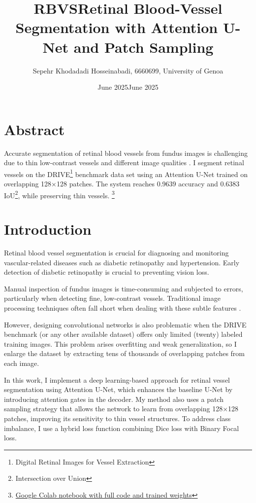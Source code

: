 \documentclass[11pt]{article}
\title{RBVS}
\author{Sepehr Khodadadi Hosseinabadi, 6660699, University of Genoa}
\date{June 2025}
\begin{document}
\title{\textbf{Retinal Blood-Vessel Segmentation with Attention U-Net and Patch Sampling}}  
\date{June 2025}
\maketitle

\section{Abstract}
\label{sec:Abstract}
Accurate segmentation of retinal blood vessels from fundus images is challenging due to thin low-contrast vessels and different image qualities \cite{memari2019retinal}. I segment retinal vessels on the DRIVE\footnote{Digital Retinal Images for Vessel Extraction} benchmark data set using an Attention U-Net trained on overlapping 128×128 patches. The system reaches 0.9639 accuracy and 0.6383 IoU\footnote{Intersection over Union}, while preserving thin vessels. \footnote{\href{https://colab.research.google.com/drive/1DBvdWY8Vw_HIo0jMHd9fOHY-Cog2nbwD?usp=sharing}{Google Colab notebook with full code and trained weights}}


\section{Introduction}
\label{sec:Introduction}

Retinal blood vessel segmentation is crucial for diagnosing and monitoring vascular-related diseases such as diabetic retinopathy and hypertension. Early detection of diabetic retinopathy is crucial to preventing vision loss.

Manual inspection of fundus images is time-consuming and subjected to errors, particularly when detecting fine, low-contrast vessels. Traditional image processing techniques often fall short when dealing with these subtle features \cite{memari2019retinal}.

However, designing convolutional networks is also problematic when the DRIVE benchmark (or any other available dataset) offers only limited (twenty) labeled training images. This problem arises overfitting and weak generalization, so I enlarge the dataset by extracting tens of thousands of overlapping patches from each image.

In this work, I implement a deep learning-based approach for retinal vessel segmentation using Attention U-Net, which enhances the baseline U-Net by introducing attention gates in the decoder. My method also uses a patch sampling strategy that allows the network to learn from overlapping 128×128 patches, improving its sensitivity to thin vessel structures. To address class imbalance, I use a hybrid loss function combining Dice loss with Binary Focal loss.
\end{document}
